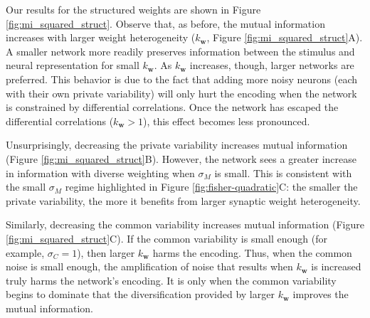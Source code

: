 \documentclass[12pt]{article}
\begin{document}
	Our results for the structured weights are shown in Figure \ref{fig:mi_squared_struct}. Observe that, as before, the mutual information increases with larger weight heterogeneity ($k_{\mathbf{w}}$, Figure \ref{fig:mi_squared_struct}A). A smaller network more readily preserves information between the stimulus and neural representation for small $k_{\mathbf{w}}$. As $k_{\mathbf{w}}$ increases, though, larger networks are preferred. This behavior is due to the fact that adding more noisy neurons (each with their own private variability) will only hurt the encoding when the network is constrained by differential correlations. Once the network has escaped the differential correlations ($k_{\mathbf{w}} > 1$), this effect becomes less pronounced.
	
	Unsurprisingly, decreasing the private variability increases mutual information (Figure \ref{fig:mi_squared_struct}B). However, the network sees a greater increase in information with diverse weighting when $\sigma_M$ is small. This is consistent with the small $\sigma_M$ regime highlighted in Figure \ref{fig:fisher-quadratic}C: the smaller the private variability, the more it benefits from larger synaptic weight heterogeneity. 
	
	Similarly, decreasing the common variability increases mutual information (Figure \ref{fig:mi_squared_struct}C). If the common variability is small enough (for example, $\sigma_C=1$), then larger $k_{\mathbf{w}}$ harms the encoding. Thus, when the common noise is small enough, the amplification of noise that results when $k_{\mathbf{w}}$ is increased truly harms the network's encoding. It is only when the common variability begins to dominate that the diversification provided by larger $k_{\mathbf{w}}$ improves the mutual information. 
\end{document}
